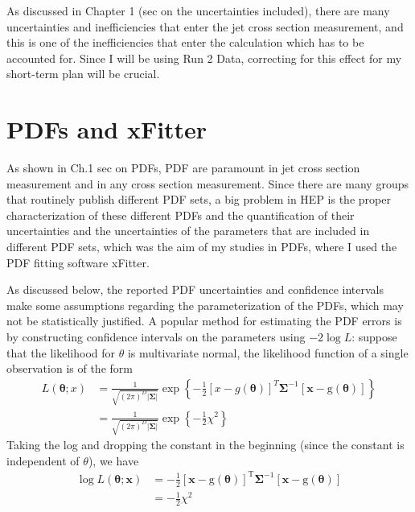 As discussed in Chapter 1 (sec on the uncertainties included), there are many uncertainties and inefficiencies that enter the jet cross section measurement, and this is one of the inefficiencies that enter the calculation which has to be accounted for. Since I will be using Run 2 Data, correcting for this effect for my short-term plan will be crucial. 


\section{PDFs and xFitter}

As shown in Ch.1 sec on PDFs, PDF are paramount in jet cross section measurement and in any cross section measurement. Since there are many groups that routinely publish different PDF sets, a big problem in HEP is the proper characterization of these different PDFs and the quantification of their uncertainties and the uncertainties of the parameters that are included in different PDF sets, which was the aim of my studies in PDFs, where I used the PDF fitting software xFitter.

As discussed below, the reported PDF uncertainties and confidence intervals make some assumptions regarding the parameterization of the PDFs, which may not be statistically justified. A popular method for estimating the PDF errors is by constructing confidence intervals on the parameters using $-2 \log L$: suppose that the likelihood for $\theta$ is multivariate normal, the likelihood function of a single observation is of the form 
\begin{equation}
\begin{aligned}
    L(\boldsymbol{\theta} ; x)&=\frac{1}{\sqrt{(2 \pi)^{D}|\boldsymbol{\Sigma}|}} \exp \left\{-\frac{1}{2}[x-g(\boldsymbol{\theta})]^{T} \boldsymbol{\Sigma}^{-1}[\boldsymbol{x}-\mathrm{g}(\boldsymbol{\theta})]\right\} \\
    &= \frac{1}{\sqrt{(2 \pi)^{D}|\boldsymbol{\Sigma}|}} \exp \left\{-\frac{1}{2}\chi^2\right\}
\end{aligned}
\end{equation}
Taking the log and dropping the constant in the beginning (since the constant is independent of $\theta$), we have
\begin{equation}
\begin{aligned}
    \log L(\boldsymbol{\theta} ; \boldsymbol{x})&=-\frac{1}{2}[\boldsymbol{x}-\mathrm{g}(\boldsymbol{\theta})]^{\mathrm{T}} \boldsymbol{\Sigma}^{-1}[\boldsymbol{x}-\mathrm{g}(\boldsymbol{\theta})] \\
    &= - \frac{1}{2} \chi^2
\end{aligned}
\end{equation}

